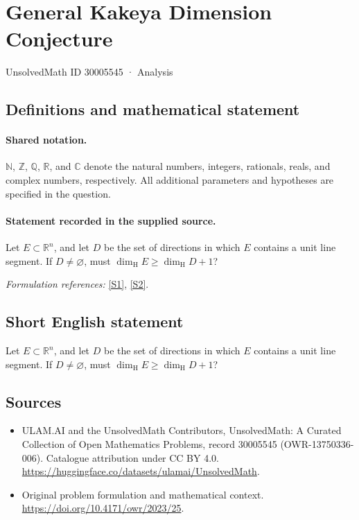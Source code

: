 \documentclass[11pt]{article}
\newcommand{\sref}[2]{\hyperlink{source:#1:#2}{[S#2]}}
\begin{document}
\setcounter{section}{30005544}
\section{General Kakeya Dimension Conjecture}\label{30005545}
{\small UnsolvedMath ID 30005545 · Analysis}
\subsection{Definitions and mathematical statement}

\paragraph{Shared notation.}$\mathbb N$, $\mathbb Z$, $\mathbb Q$, $\mathbb R$, and $\mathbb C$ denote the natural numbers, integers, rationals, reals, and complex numbers, respectively. All additional parameters and hypotheses are specified in the question.


\paragraph{Statement recorded in the supplied source.}
Let $E\subset\mathbb R^n$, and let $D$ be the set of directions in which $E$ contains a unit line segment. If $D\neq\varnothing$, must $\dim_{\mathrm H}E\geq\dim_{\mathrm H}D+1$?
\par\smallskip\textit{Formulation references:} \sref{30005545}{1}, \sref{30005545}{2}.
\subsection{Short English statement}
Let $E\subset\mathbb R^n$, and let $D$ be the set of directions in which $E$ contains a unit line segment. If $D\neq\varnothing$, must $\dim_{\mathrm H}E\geq\dim_{\mathrm H}D+1$?
\subsection{Sources}
\begin{itemize}
\item[\hypertarget{source:30005545:1}{S1}] ULAM.AI and the UnsolvedMath Contributors, UnsolvedMath: A Curated Collection of Open Mathematics Problems, record 30005545 (OWR-13750336-006). Catalogue attribution under CC BY 4.0.
\url{https://huggingface.co/datasets/ulamai/UnsolvedMath}.
\item[\hypertarget{source:30005545:2}{S2}] Original problem formulation and mathematical context.
\url{https://doi.org/10.4171/owr/2023/25}.
\end{itemize}
\label{end:30005545}
\end{document}

